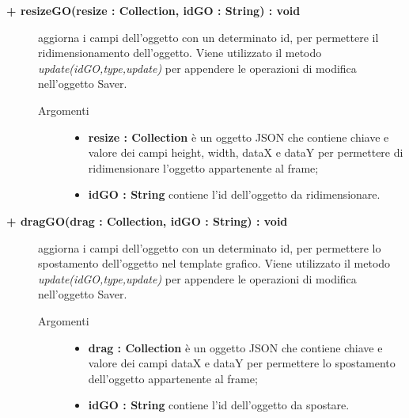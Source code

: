 \begin{description}
\begin{description}
\begin{description}
\begin{description}
\end{description}

\end{description}

\begin{description}
		\item[\textbf{\color{blue}+ resizeGO(resize : Collection, idGO : String) : void			}] \hfill
			aggiorna i campi dell'oggetto con un determinato id, per permettere il ridimensionamento dell'oggetto. Viene utilizzato il metodo \textit{update(idGO,type,update)} per appendere le operazioni di modifica nell'oggetto Saver.    

\begin{description}
			\item[Argomenti] \hfill
				\begin{itemize}
					\item \textbf{resize : Collection			} \hfill
					è un oggetto JSON che contiene chiave e valore dei campi height, width, dataX e dataY per permettere di ridimensionare l'oggetto appartenente al frame;
					\item \textbf{idGO : String			} \hfill
					contiene l'id dell'oggetto da ridimensionare.
				\end{itemize}

\end{description}

\end{description}

\begin{description}
		\item[\textbf{\color{blue}+ dragGO(drag : Collection, idGO : String) : void			}] \hfill
			aggiorna i campi dell'oggetto con un determinato id, per permettere lo spostamento dell'oggetto nel template grafico. Viene utilizzato il metodo \textit{update(idGO,type,update)} per appendere le operazioni di modifica nell'oggetto Saver.    

\begin{description}
			\item[Argomenti] \hfill
				\begin{itemize}
					\item \textbf{drag : Collection			} \hfill
					è un oggetto JSON che contiene chiave e valore dei campi dataX e dataY per permettere lo spostamento dell'oggetto appartenente al frame;
					\item \textbf{idGO : String			} \hfill
					contiene l'id dell'oggetto da spostare.
				\end{itemize}


\end{description}
\end{description}
\end{description}
\end{description}
